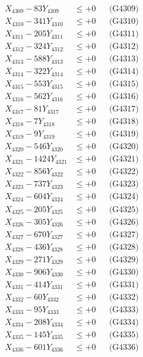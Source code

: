 \documentclass[a4paper,10pt]{article}
\begin{document}
{\begin{align}
X_{4309} - 83Y_{4309} &\leq +0 && \text{(G4309)} \\
X_{4310} - 341Y_{4310} &\leq +0 && \text{(G4310)} \\
\allowbreak
X_{4311} - 205Y_{4311} &\leq +0 && \text{(G4311)} \\
X_{4312} - 324Y_{4312} &\leq +0 && \text{(G4312)} \\
X_{4313} - 588Y_{4313} &\leq +0 && \text{(G4313)} \\
X_{4314} - 322Y_{4314} &\leq +0 && \text{(G4314)} \\
X_{4315} - 553Y_{4315} &\leq +0 && \text{(G4315)} \\
X_{4316} - 562Y_{4316} &\leq +0 && \text{(G4316)} \\
X_{4317} - 81Y_{4317} &\leq +0 && \text{(G4317)} \\
X_{4318} - 7Y_{4318} &\leq +0 && \text{(G4318)} \\
X_{4319} - 9Y_{4319} &\leq +0 && \text{(G4319)} \\
X_{4320} - 546Y_{4320} &\leq +0 && \text{(G4320)} \\
\allowbreak
X_{4321} - 1424Y_{4321} &\leq +0 && \text{(G4321)} \\
X_{4322} - 856Y_{4322} &\leq +0 && \text{(G4322)} \\
X_{4323} - 737Y_{4323} &\leq +0 && \text{(G4323)} \\
X_{4324} - 604Y_{4324} &\leq +0 && \text{(G4324)} \\
X_{4325} - 205Y_{4325} &\leq +0 && \text{(G4325)} \\
X_{4326} - 305Y_{4326} &\leq +0 && \text{(G4326)} \\
X_{4327} - 670Y_{4327} &\leq +0 && \text{(G4327)} \\
X_{4328} - 436Y_{4328} &\leq +0 && \text{(G4328)} \\
X_{4329} - 271Y_{4329} &\leq +0 && \text{(G4329)} \\
X_{4330} - 906Y_{4330} &\leq +0 && \text{(G4330)} \\
\allowbreak
X_{4331} - 414Y_{4331} &\leq +0 && \text{(G4331)} \\
X_{4332} - 60Y_{4332} &\leq +0 && \text{(G4332)} \\
X_{4333} - 95Y_{4333} &\leq +0 && \text{(G4333)} \\
X_{4334} - 208Y_{4334} &\leq +0 && \text{(G4334)} \\
X_{4335} - 145Y_{4335} &\leq +0 && \text{(G4335)} \\
X_{4336} - 601Y_{4336} &\leq +0 && \text{(G4336)} \\

\end{align}}
\end{document}
